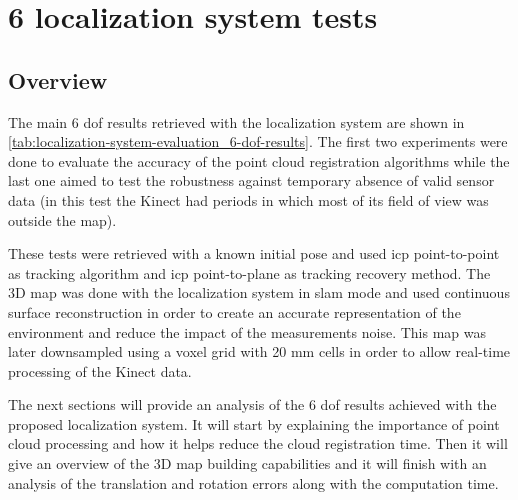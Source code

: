 \clearpage

\section{6  localization system tests}\label{sec:tridimensional-localization-system-tests}

\subsection{Overview}

The main 6 \gls{dof} results retrieved with the localization system are shown in \cref{tab:localization-system-evaluation_6-dof-results}. The first two experiments were done to evaluate the accuracy of the point cloud registration algorithms while the last one aimed to test the robustness against temporary absence of valid sensor data (in this test the Kinect had periods in which most of its field of view was outside the map).

These tests were retrieved with a known initial pose and used \gls{icp} point-to-point as tracking algorithm and \gls{icp} point-to-plane as tracking recovery method. The 3D map was done with the localization system in \gls{slam} mode and used continuous surface reconstruction in order to create an accurate representation of the environment and reduce the impact of the measurements noise. This map was later downsampled using a voxel grid with 20 mm cells in order to allow real-time processing of the Kinect data.

The next sections will provide an analysis of the 6 \gls{dof} results achieved with the proposed localization system. It will start by explaining the importance of point cloud processing and how it helps reduce the cloud registration time. Then it will give an overview of the 3D map building capabilities and it will finish with an analysis of the translation and rotation errors along with the computation time.


